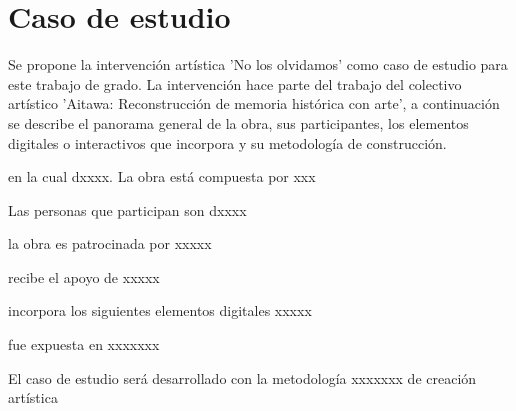 
\chapter{Caso de estudio}
\label{Caso_de_estudio}

Se propone la intervención artística 'No los olvidamos' como caso de estudio para este trabajo de grado. La intervención hace parte del trabajo del colectivo artístico 'Aitawa: Reconstrucción de memoria histórica con arte', a continuación se describe el panorama general de la obra, sus participantes, los elementos digitales o interactivos que incorpora y su metodología de construcción.

en la cual dxxxx. La obra está compuesta por xxx

Las personas que participan son dxxxx

la obra es patrocinada por xxxxx

recibe el apoyo de xxxxx

incorpora los siguientes elementos digitales xxxxx

fue expuesta en xxxxxxx

El caso de estudio será desarrollado con la metodología xxxxxxx de creación artística

